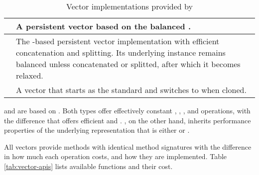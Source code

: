 \begin{table}[!htbp]

    \centering
    \begin{tabular} { |p{18mm}|p{112mm}| }
        \hline
        \rbvec{} & A persistent vector based on the balanced \rrbtree{}. \\ \hline
        \rrbvec{} & The \rrbtree{}-based persistent vector implementation with efficient concatenation and splitting. Its underlying \rrbtree{} instance remains balanced unless concatenated or splitted, after which it becomes relaxed. \\ \hline
        \pvec{} & A vector that starts as the standard and switches to \rrbvec{} when cloned. \\ \hline
    \end{tabular}

    \label{tab:vec-implementations}
    \caption{Vector implementations provided by \pvecrs{}}
\end{table}

\rbvec{} and \rrbvec{} are based on \rrbtree{}. Both types offer effectively constant , , , and  operations, with the difference that \rrbvec{} offers efficient  and . \pvec{}, on the other hand, inherits performance properties of the underlying representation that is either \stdvec{} or \rrbvec{}.

All vectors provide methods with identical method signatures with the difference in how much each operation costs, and how they are implemented. Table \ref{tab:vector-apis} lists available functions and their cost.


